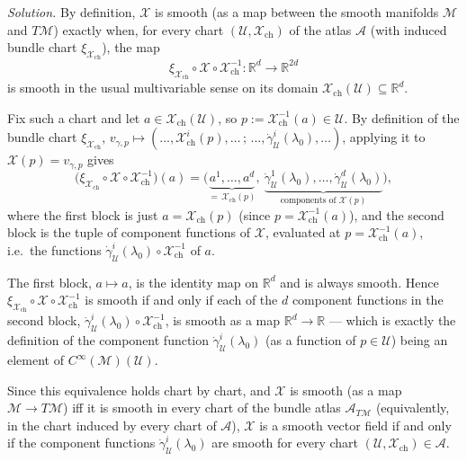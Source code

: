 \documentclass[11pt]{article}
\newcommand{\Cinf}{C^\infty(\mathcal M)}
\begin{document}
\medskip
\noindent\textit{Solution.} By definition, $\mathcal X$ is smooth
(as a map between the smooth manifolds $\mathcal M$ and $T\mathcal M$)
exactly when, for every chart $(\mathcal U,\mathcal X_{\mathrm{ch}})$ of
the atlas $\mathcal A$ (with induced bundle chart $\xi_{\mathcal
X_{\mathrm{ch}}}$), the map
\[
\xi_{\mathcal X_{\mathrm{ch}}}\circ\mathcal X\circ\mathcal X_{\mathrm{ch}}^{-1}:\mathbb R^d\to\mathbb R^{2d}
\]
is smooth in the usual multivariable sense on its domain
$\mathcal X_{\mathrm{ch}}(\mathcal U)\subseteq\mathbb R^d$.

Fix such a chart and let $a\in\mathcal X_{\mathrm{ch}}(\mathcal U)$, so
$p:=\mathcal X_{\mathrm{ch}}^{-1}(a)\in\mathcal U$. By definition of the
bundle chart $\xi_{\mathcal X_{\mathrm{ch}}}$, $v_{\gamma,p}\mapsto(\dots,
\mathcal X_{\mathrm{ch}}^i(p),\dots\,;\,\dots,\dot\gamma^i_{\mathcal
U}(\lambda_0),\dots)$, applying it to $\mathcal X(p)=v_{\gamma,p}$ gives
\[
\big(\xi_{\mathcal X_{\mathrm{ch}}}\circ\mathcal X\circ\mathcal X_{\mathrm{ch}}^{-1}\big)(a) = \big(\underbrace{a^1,\dots,a^d}_{=\,\mathcal X_{\mathrm{ch}}(p)},\ \underbrace{\dot\gamma^1_{\mathcal U}(\lambda_0),\dots,\dot\gamma^d_{\mathcal U}(\lambda_0)}_{\text{components of }\mathcal X(p)}\big),
\]
where the first block is just $a=\mathcal X_{\mathrm{ch}}(p)$ (since
$p=\mathcal X_{\mathrm{ch}}^{-1}(a)$), and the second block is the tuple of
component functions of $\mathcal X$, evaluated at $p=\mathcal
X_{\mathrm{ch}}^{-1}(a)$, i.e.\ the functions $\dot\gamma^i_{\mathcal
U}(\lambda_0)\circ\mathcal X_{\mathrm{ch}}^{-1}$ of $a$.

The first block, $a\mapsto a$, is the identity map on $\mathbb R^d$ and is
always smooth. Hence $\xi_{\mathcal X_{\mathrm{ch}}}\circ\mathcal
X\circ\mathcal X_{\mathrm{ch}}^{-1}$ is smooth if and only if each of the
$d$ component functions in the second block,
$\dot\gamma^i_{\mathcal U}(\lambda_0)\circ\mathcal X_{\mathrm{ch}}^{-1}$,
is smooth as a map $\mathbb R^d\to\mathbb R$ — which is exactly the
definition of the component function $\dot\gamma^i_{\mathcal
U}(\lambda_0)$ (as a function of $p\in\mathcal U$) being an element of
$\Cinf(\mathcal U)$.

Since this equivalence holds chart by chart, and $\mathcal X$ is smooth
(as a map $\mathcal M\to T\mathcal M$) iff it is smooth in every chart of
the bundle atlas $\mathcal A_{T\mathcal M}$ (equivalently, in the chart
induced by every chart of $\mathcal A$), $\mathcal X$ is a smooth vector
field if and only if the component functions
$\dot\gamma^i_{\mathcal U}(\lambda_0)$ are smooth for every chart
$(\mathcal U,\mathcal X_{\mathrm{ch}})\in\mathcal A$.
\end{document}
